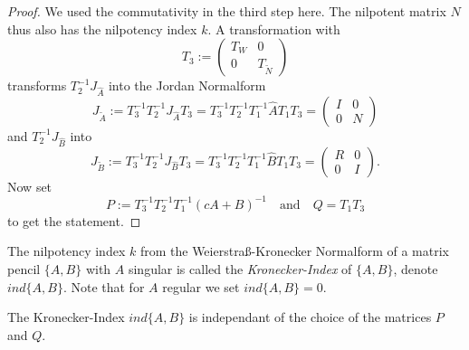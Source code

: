 \begin{proof}
	We used the commutativity in the third step here. The nilpotent matrix $N$ thus also has the nilpotency index $k$. A transformation with
	\begin{displaymath}
		T_3 := 
		\left(
		\begin{matrix}
			T_W & 0 \\
			0 & T_{\tilde{N}}
		\end{matrix}
		\right)
	\end{displaymath}
	transforms $T_2^{-1}J_{\hat{A}}$ into the Jordan Normalform
	\begin{displaymath}
		J_{\tilde{A}} := T_3^{-1}T_2^{-1}J_{\hat{A}}T_3 = T_3^{-1}T_2^{-1}T_1^{-1}\hat{A}T_1T_3 = 
		\left(
		\begin{matrix}
			I & 0 \\
			0 & N
		\end{matrix}
		\right)
	\end{displaymath}
	and $T_2^{-1}J_{\hat{B}}$ into
	\begin{displaymath}
		J_{\tilde{B}} := T_3^{-1}T_2^{-1}J_{\hat{B}}T_3 = T_3^{-1}T_2^{-1}T_1^{-1}\hat{B}T_1T_3 = 
		\left(
		\begin{matrix}
			R & 0 \\
			0 & I
		\end{matrix}
		\right) .
	\end{displaymath}
	Now set
	\begin{displaymath}
		P:= T_3^{-1}T_2^{-1}T_1^{-1}(cA+B)^{-1} \quad \text{and} \quad Q = T_1T_3
	\end{displaymath}
	to get the statement.
\end{proof}

\begin{definition}
	The nilpotency index $k$ from the Weierstraß-Kronecker Normalform of a matrix pencil $\{A,B\}$ with $A$ singular is called the \emph{Kronecker-Index} of $\{A,B\}$, denote $ind\{A,B\}$. Note that for $A$ regular we set $ind\{A,B\} = 0$.
\end{definition}


\begin{lemma}
	The Kronecker-Index $ind\{A,B\}$ is independant of the choice of the matrices $P$ and $Q$.
\end{lemma}


